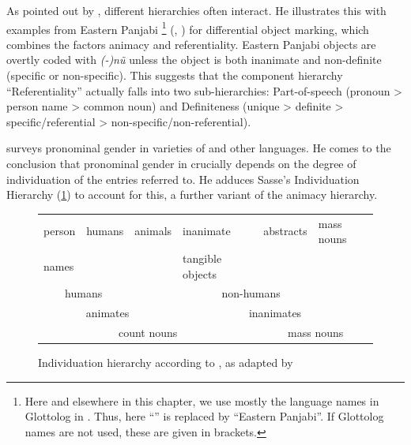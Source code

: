 \documentclass[output=collectionpaper]{langsci/langscibook}
\begin{document}
%

As pointed out by \cite[166]{Croft2003}, different hierarchies often interact. He illustrates this with examples from Eastern Panjabi%
\footnote{%
Here and elsewhere in this chapter, we use mostly the language names in Glottolog in \cite{Hammarstroem2018}. Thus, here ``'' is replaced by ``Eastern Panjabi''. If Glottolog names are not used, these are given in brackets.
} %
(, ) for differential object marking, which combines the factors animacy and referentiality. Eastern Panjabi objects are overtly coded with \textit{(-)nũ} unless the object is both inanimate and non-definite (specific or non-specific). This suggests that the component hierarchy ``Referentiality'' actually falls into two sub-hierarchies: Part-of-speech (pronoun > person name > common noun) and Definiteness (unique > definite > specific/referential > non-specific/non-referential).

\cite{Siemund2008} surveys pronominal gender in varieties of  and other languages. He comes to the conclusion that pronominal gender in  crucially depends on the degree of individuation of the entries referred to. He adduces Sasse's Individuation Hierarchy (\ref{fig:WDG:1}) to account for this, a further variant of the animacy hierarchy.

\begin{figure}[htb]
\begin{tabular}{|l|l|l|l|l|l|}
\hline person &	humans &	animals &	inanimate  &	abstracts	& mass nouns \\
names & & & tangible objects & & \\
\hline \multicolumn{2}{|c|}{humans} &	\multicolumn{4}{c|}{non-humans} \\
\hline \multicolumn{3}{|c|}{animates} &	\multicolumn{3}{c|}{inanimates} \\
\hline \multicolumn{4}{|c|}{count nouns} &	\multicolumn{2}{c|}{mass nouns} \\
\hline
\end{tabular}
\caption{Individuation hierarchy according to \cite[659]{Sasse1993}, as adapted by \citet[90]{Karatsareas2014}}
\label{fig:WDG:1}
\end{figure}
\end{document}
